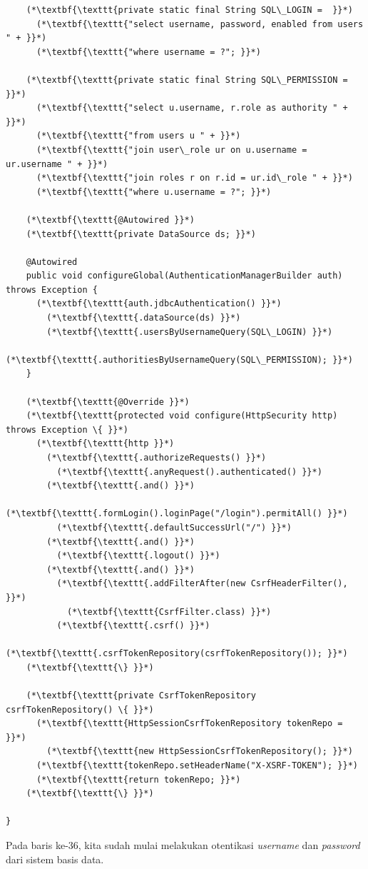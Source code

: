 \begin{enumerate}
\begin{lstlisting}
	(*\textbf{\texttt{private static final String SQL\_LOGIN =  }}*)
	  (*\textbf{\texttt{"select username, password, enabled from users " + }}*)
	  (*\textbf{\texttt{"where username = ?"; }}*)

	(*\textbf{\texttt{private static final String SQL\_PERMISSION = }}*)
	  (*\textbf{\texttt{"select u.username, r.role as authority " + }}*)
	  (*\textbf{\texttt{"from users u " + }}*)
	  (*\textbf{\texttt{"join user\_role ur on u.username = ur.username " + }}*)
	  (*\textbf{\texttt{"join roles r on r.id = ur.id\_role " + }}*)
	  (*\textbf{\texttt{"where u.username = ?"; }}*)

	(*\textbf{\texttt{@Autowired }}*)
	(*\textbf{\texttt{private DataSource ds; }}*)
	
	@Autowired
	public void configureGlobal(AuthenticationManagerBuilder auth) throws Exception {
	  (*\textbf{\texttt{auth.jdbcAuthentication() }}*)
	    (*\textbf{\texttt{.dataSource(ds) }}*)
	    (*\textbf{\texttt{.usersByUsernameQuery(SQL\_LOGIN) }}*)
	    (*\textbf{\texttt{.authoritiesByUsernameQuery(SQL\_PERMISSION); }}*)
	}

	(*\textbf{\texttt{@Override }}*)
	(*\textbf{\texttt{protected void configure(HttpSecurity http) throws Exception \{ }}*)
	  (*\textbf{\texttt{http }}*)
	    (*\textbf{\texttt{.authorizeRequests() }}*)
	      (*\textbf{\texttt{.anyRequest().authenticated() }}*)
	    (*\textbf{\texttt{.and() }}*)
	      (*\textbf{\texttt{.formLogin().loginPage("/login").permitAll() }}*)
	      (*\textbf{\texttt{.defaultSuccessUrl("/") }}*)
	    (*\textbf{\texttt{.and() }}*)
	      (*\textbf{\texttt{.logout() }}*)
	    (*\textbf{\texttt{.and() }}*)
	      (*\textbf{\texttt{.addFilterAfter(new CsrfHeaderFilter(), }}*)
	        (*\textbf{\texttt{CsrfFilter.class) }}*)
	      (*\textbf{\texttt{.csrf() }}*)
	        (*\textbf{\texttt{.csrfTokenRepository(csrfTokenRepository()); }}*)
	(*\textbf{\texttt{\} }}*)

	(*\textbf{\texttt{private CsrfTokenRepository csrfTokenRepository() \{ }}*)
	  (*\textbf{\texttt{HttpSessionCsrfTokenRepository tokenRepo = }}*)
	    (*\textbf{\texttt{new HttpSessionCsrfTokenRepository(); }}*)
	  (*\textbf{\texttt{tokenRepo.setHeaderName("X-XSRF-TOKEN"); }}*)
	  (*\textbf{\texttt{return tokenRepo; }}*)
	(*\textbf{\texttt{\} }}*)

}
	\end{lstlisting}
	
	Pada baris ke-36, kita sudah mulai melakukan otentikasi \textit{username} dan \textit{password} dari sistem basis data. 
	

\end{enumerate}
